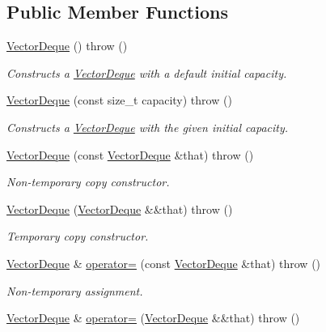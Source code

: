\subsection*{Public Member Functions}
\begin{DoxyCompactItemize}
\item 
\hyperlink{classVectorDeque_a6ccd352013e04ac9b27651028481ff9c}{Vector\-Deque} ()  throw ()
\begin{DoxyCompactList}\small\item\em Constructs a {\ttfamily \hyperlink{classVectorDeque}{Vector\-Deque}} with a default initial capacity. \end{DoxyCompactList}\item 
\hyperlink{classVectorDeque_a77d6b83cb5d9fb65d6ac1ddfa6833205}{Vector\-Deque} (const size\-\_\-t capacity)  throw ()
\begin{DoxyCompactList}\small\item\em Constructs a {\ttfamily \hyperlink{classVectorDeque}{Vector\-Deque}} with the given initial capacity. \end{DoxyCompactList}\item 
\hyperlink{classVectorDeque_ae86351d1ecec0183193144844518a971}{Vector\-Deque} (const \hyperlink{classVectorDeque}{Vector\-Deque} \&that)  throw ()
\begin{DoxyCompactList}\small\item\em Non-\/temporary copy constructor. \end{DoxyCompactList}\item 
\hyperlink{classVectorDeque_aa05f563b1148c66067be9a796cfaed13}{Vector\-Deque} (\hyperlink{classVectorDeque}{Vector\-Deque} \&\&that)  throw ()
\begin{DoxyCompactList}\small\item\em Temporary copy constructor. \end{DoxyCompactList}\item 
\hyperlink{classVectorDeque}{Vector\-Deque} \& \hyperlink{classVectorDeque_a8be7a91c8d970e4dacce3500116b6f06}{operator=} (const \hyperlink{classVectorDeque}{Vector\-Deque} \&that)  throw ()
\begin{DoxyCompactList}\small\item\em Non-\/temporary assignment. \end{DoxyCompactList}\item 
\hyperlink{classVectorDeque}{Vector\-Deque} \& \hyperlink{classVectorDeque_a80a42da54a15e4f0b4e9f9430e2278a2}{operator=} (\hyperlink{classVectorDeque}{Vector\-Deque} \&\&that)  throw ()

\end{DoxyCompactItemize}
